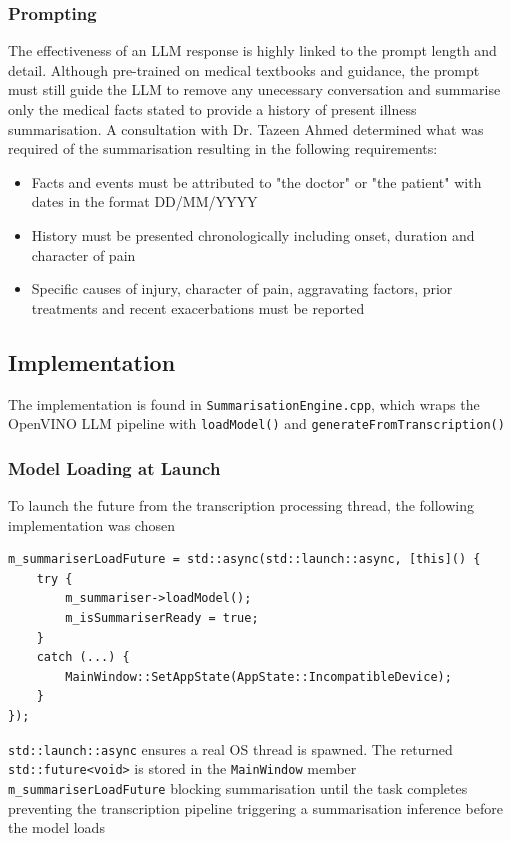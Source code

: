 \subsubsection{Prompting}
The effectiveness of an LLM response is highly linked to the prompt length and detail. Although pre-trained on medical textbooks and guidance, the prompt must still guide the LLM to remove any unecessary conversation and summarise only the medical facts stated to provide a history of present illness summarisation. A consultation with Dr. Tazeen Ahmed determined what was required of the summarisation resulting in the following requirements:
\begin{itemize}
    \item Facts and events must be attributed to "the doctor" or "the patient" with dates in the format DD/MM/YYYY
    \item History must be presented chronologically including onset, duration and character of pain
    \item Specific causes of injury, character of pain, aggravating factors, prior treatments and recent exacerbations must be reported
\end{itemize}

\subsection{Implementation}
The implementation is found in \texttt{SummarisationEngine.cpp}, which wraps the OpenVINO LLM pipeline with \texttt{loadModel()} and \texttt{generateFromTranscription()}

\subsubsection{Model Loading at Launch}
To launch the future from the transcription processing thread, the following implementation was chosen
\begin{verbatim}
m_summariserLoadFuture = std::async(std::launch::async, [this]() {
    try {
        m_summariser->loadModel();
        m_isSummariserReady = true;
    }
    catch (...) {
        MainWindow::SetAppState(AppState::IncompatibleDevice);
    }
});
\end{verbatim}

\texttt{std::launch::async} ensures a real OS thread is spawned. The returned \texttt{std::future<void>} is stored in the \texttt{MainWindow} member \texttt{m\_summariserLoadFuture} blocking summarisation until the task completes preventing the transcription pipeline triggering a summarisation inference before the model loads

